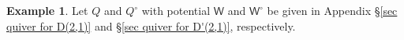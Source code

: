 \documentclass[10pt]{amsart}
\theoremstyle{definition}
\newtheorem{Example}[Theorem]{Example}
\numberwithin{equation}{section}
\newcommand{\bC}{\mathbb{C}}
\newcommand{\bZ}{\mathbb{Z}}
\newcommand{\sT}{\mathsf{T}}
\newcommand{\sW}{\mathsf{W}}
\newcommand{\sw}{\mathsf{w}}
\newcommand{\pt}{\operatorname{pt}}
\newcommand{\tr}{\operatorname{tr}}
\begin{document}
\begin{Example}\label{ex on dd ex}
Let $Q$ and $Q^\circ$ with potential $\sW$ and $\sW^\circ$ be given in Appendix \S\ref{sec quiver for D(2,1)} and \S\ref{sec quiver for D'(2,1)}, respectively.



\end{Example}
\end{document}
